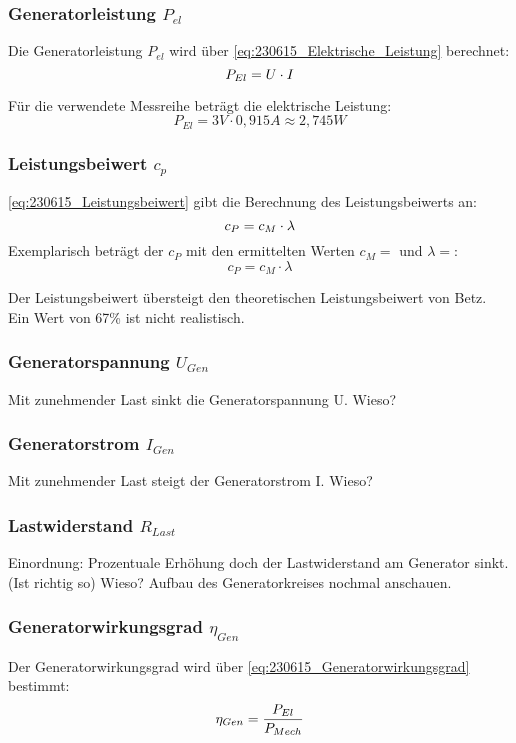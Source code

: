 \subsubsection*{Generatorleistung $P_{el}$}
Die Generatorleistung $P_{el}$ wird über \autoref{eq:230615_Elektrische_Leistung} berechnet:
\begin{equation}
    \centering
    P_{El} = U \cdot I
    \label{eq:230615_Elektrische_Leistung}
\end{equation}

Für die verwendete Messreihe beträgt die elektrische Leistung:
$$P_{El} = 3V \cdot 0,915A \approx 2,745W$$


\subsubsection*{Leistungsbeiwert $c_p$}
\autoref{eq:230615_Leistungsbeiwert} gibt die Berechnung des Leistungsbeiwerts an:
 \begin{equation}
     \centering
     c_P = c_M \cdot \lambda
     \label{eq:230615_Leistungsbeiwert}
 \end{equation}
Exemplarisch beträgt der $c_P$ mit den ermittelten Werten $c_M = $ und $\lambda =$:
 $$c_P = c_M \cdot \lambda$$

 Der Leistungsbeiwert übersteigt den theoretischen Leistungsbeiwert von Betz. Ein Wert von 67\% ist nicht realistisch.

\subsubsection*{Generatorspannung $U_{Gen}$}
Mit zunehmender Last sinkt die Generatorspannung U. Wieso?
\subsubsection*{Generatorstrom $I_{Gen}$}
Mit zunehmender Last steigt der Generatorstrom I. Wieso?
\subsubsection*{Lastwiderstand $R_{Last}$}
Einordnung: Prozentuale Erhöhung doch der Lastwiderstand am Generator sinkt. (Ist richtig so) Wieso? Aufbau des Generatorkreises nochmal anschauen.
\subsubsection*{Generatorwirkungsgrad $\eta_{Gen}$}
Der Generatorwirkungsgrad wird über \autoref{eq:230615_Generatorwirkungsgrad} bestimmt:
\begin{equation}
    \centering
    \eta_{Gen} = \frac{P_{El}}{P_{Mech}}
    \label{eq:230615_Generatorwirkungsgrad}
\end{equation}

